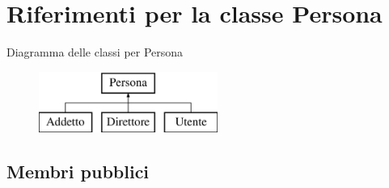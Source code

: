 \hypertarget{class_persona}{}\section{Riferimenti per la classe Persona}
\label{class_persona}
Diagramma delle classi per Persona\begin{figure}[H]
\begin{center}
\leavevmode
\includegraphics[height=2.000000cm]{class_persona}
\end{center}
\end{figure}
\subsection*{Membri pubblici}

